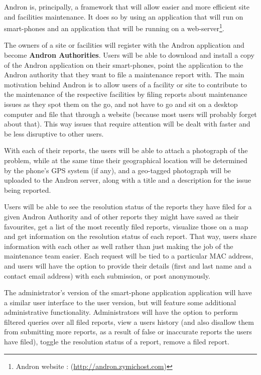 \documentclass[12pt]{ecsproject}     %
\begin{document}
Andron is, principally, a framework that will allow easier and more efficient site and facilities maintenance. It does so by using an application that will run on smart-phones and an application that will be running on a web-server\footnote{Andron website : (\hyperlink{http://andron.zymichost.com}{http://andron.zymichost.com})}.

The owners of a site or facilities will register with the Andron application and become \textbf{Andron Authorities}. Users will be able to download and install a copy of the Andron application on their smart-phones, point the application to the Andron authority that they want to file a maintenance report with. The main motivation behind Andron is to allow users of a facility or site to contribute to the maintenance of the respective facilities by filing reports about maintenance issues as they spot them on the go, and not have to go and sit on a desktop computer and file that through a website (because most users will probably forget about that). This way issues that require attention will be dealt with faster and be less disruptive to other users.

With each of their reports, the users will be able to attach a photograph of the problem, while at the same time their geographical location will be determined by the phone's GPS system (if any), and a geo-tagged photograph will be uploaded to the Andron server, along with a title and a description for the issue being reported. 

Users will be able to see the resolution status of the reports they have filed for a given Andron Authority and of other reports they might have saved as their favourites, get a list of the most recently filed reports, visualize those on a map and get information on the resolution status of each report. That way, users share information with each other as well rather than just making the job of the maintenance team easier. Each request will be tied to a particular MAC address, and users will have the option to provide their details (first and last name and a contact email address) with each submission, or post anonymously.

The administrator's version of the smart-phone application application will have a similar user interface to the user version, but will feature some additional administrative functionality. Administrators will have the option to perform filtered queries over all filed reports, view a users history (and also disallow them from submitting more reports, as a result of false or inaccurate reports the users have filed), toggle the resolution status of a report, remove a filed report.
\end{document}
